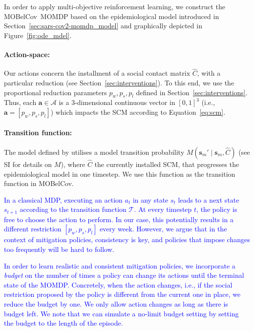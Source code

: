 \documentclass{article}
\newcommand\added[1]{\textcolor{blue}{#1}}
\newcommand{\mdpactionspace}{\mathcal{A}}
\newcommand{\mdptransition}{\mathcal{T}}
\newcommand{\state}{s}
\newcommand{\mdpstate}{\mathbf{s}}
\newcommand{\action}{a}
\newcommand{\mdpaction}{\mathbf{a}}
\newcommand{\momdpname}{MOBelCov}
\begin{document}
In order to apply multi-objective reinforcement learning, we construct the \momdpname\ MOMDP based on the epidemiological model introduced in Section~\ref{sec:sars-cov2-momdp_model} and graphically depicted in Figure~\ref{fig:ode_mdel}.

\paragraph{Action-space:} Our actions concern the installment of a social contact matrix $\hat{C}$, with a particular reduction (see Section~\ref{sec:interventions}). To this end, we use the proportional reduction parameters $p_w, p_s, p_l$ defined in Section~\ref{sec:interventions}. Thus, each $\mdpaction \in \mdpactionspace$ is a 3-dimensional continuous vector in $[0,1]^3$ (i.e., $\mdpaction = [p_{w}, p_{s}, p_{l}]$) which impacts the SCM according to Equation~\ref{eq:scm}.

\paragraph{Transition function:} The model defined by \citet{abrams2021modelling} utilises a model transition probability $M(\mdpstate_m' \mid \mdpstate_m, \hat{C})$ (see SI for details on $M$), where $\hat{C}$ the currently installed SCM, that progresses the epidemiological model in one timestep.
We use this function as the transition function in \momdpname.

\added{In a classical MDP, executing an action $\action_t$ in any state $\state_t$ leads to a next state $\state_{t+1}$ according to the transition function $\mdptransition$. At every timestep $t$, the policy is free to choose the action to perform. In our case, this potentially results in a different restriction $[p_{w}, p_{s}, p_{l}]$ every week. However, we argue that in the context of mitigation policies, consistency is key, and policies that impose changes too frequently will be hard to follow.}

\added{In order to learn realistic and consistent mitigation policies, we incorporate a \emph{budget} on the number of times a policy can change its actions until the terminal state of the MOMDP. Concretely, when the action changes, i.e., if the social restriction proposed by the policy is different from the current one in place, we reduce the budget by one. We only allow action changes as long as there is budget left. We note that we can simulate a no-limit budget setting by setting the budget to the length of the episode.}
\end{document}
